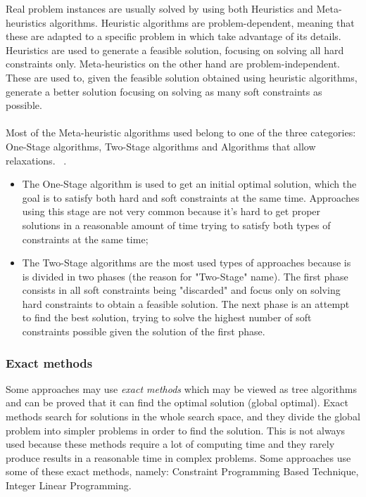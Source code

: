 Real problem instances are usually solved by using both Heuristics and Meta-heuristics algorithms. Heuristic algorithms are problem-dependent, meaning that these are adapted to a specific problem in which take advantage of its details. Heuristics are used to generate a feasible solution, focusing on solving all hard constraints only. Meta-heuristics on the other hand are problem-independent. These are used to, given the feasible solution obtained using heuristic algorithms, generate a better solution focusing on solving as many soft constraints as possible.\\
\\
Most of the Meta-heuristic algorithms used belong to one of the three categories: One-Stage algorithms, Two-Stage algorithms and Algorithms that allow relaxations. ~\cite{Lewis2007}. 
\begin{itemize}
  \item The One-Stage algorithm is used to get an initial optimal solution, which the goal is to satisfy both hard and soft constraints at the same time. Approaches using this stage are not very common because it's hard to get proper solutions in a reasonable amount of time trying to satisfy both types of constraints at the same time;
  \item The Two-Stage algorithms are the most used types of approaches because is is divided in two phases (the reason for "Two-Stage" name). The first phase consists in all soft constraints being "discarded" and focus only on solving hard constraints to obtain a feasible solution. The next phase is an attempt to find the best solution, trying to solve the highest number of soft constraints possible given the solution of the first phase.
\end{itemize}

\subsubsection{Exact methods}
\label{subsection:exactmethods}
Some approaches may use \textit{exact methods} which may be viewed as tree algorithms and can be proved that it can find the optimal solution (global optimal). Exact methods search for solutions in the whole search space, and they divide the global problem into simpler problems in order to find the solution. This is not always used because these methods require a lot of computing time and they rarely produce results in a reasonable time in complex problems. Some approaches use some of these exact methods, namely: Constraint Programming Based Technique, Integer Linear Programming.\\

